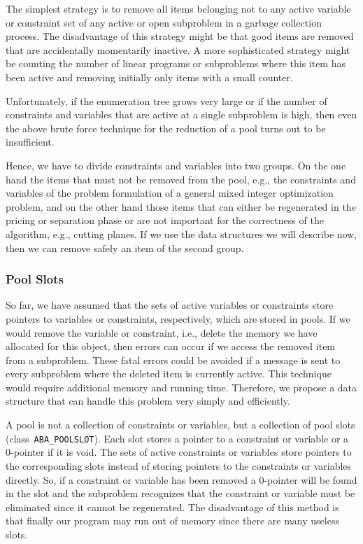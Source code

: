 The simplest strategy is to remove all items belonging not to 
any active variable or constraint set of any active or open subproblem
in a garbage collection process.
The disadvantage of this strategy might be that good items
are removed that are accidentally momentarily inactive.
A more sophisticated strategy might be
counting the number of linear programs or subproblems where
this item has been active and removing initially only items
with a small counter.

Unfortunately, if the enumeration tree grows very large or if the
number of constraints and variables that are active at a single subproblem
is high, then even the above brute force technique for the
reduction of a pool turns out to be insufficient.

Hence, we have to divide constraints and variables into two groups.
On the one hand the items that must not be removed from the pool,
e.g., the constraints and variables of the problem formulation
of a general mixed integer optimization problem, and on the other hand
those items that can either be regenerated in the pricing or
separation phase or are not important for the correctness of the algorithm,
e.g., cutting planes. If we use the
data structures we will describe now, then we can remove safely an
item of the second group.

\subsubsection{Pool Slots}

So far, we have assumed that the sets of active variables or
constraints store pointers to variables or constraints, respectively,
which are stored in pools. If we would remove the variable or
constraint, i.e., delete the memory we have allocated for this object, then
errors can occur if we access the removed item
from a subproblem. These fatal errors could be avoided if a message
is sent to every subproblem where the deleted item is currently
active. This technique would require additional memory and running time.
Therefore, we propose a data structure that can handle this problem
very simply and efficiently.

A pool is not a collection of constraints or variables, but
a collection of pool slots (class~{\tt ABA\_POOLSLOT}). 
Each slot stores a pointer to a constraint
or variable or a 0-pointer if it is void. The sets of active constraints
or variables store pointers to the corresponding slots instead of 
storing pointers to the constraints or variables directly. So,
if a constraint or variable has been removed a 0-pointer will
be found in the slot and the subproblem recognizes that the 
constraint or variable must be eliminated since it cannot be 
regenerated. The disadvantage of this method is that finally
our program may run out of memory since there are many
useless slots.

